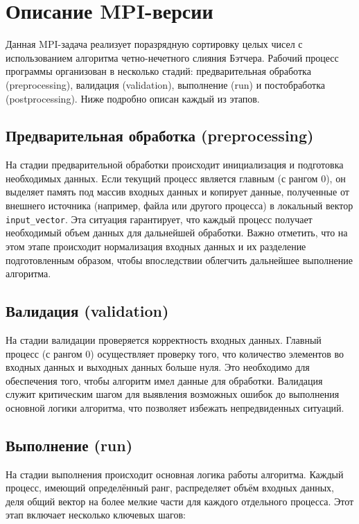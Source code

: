 \documentclass[12pt]{article}
\begin{document}
\section{Описание MPI-версии}

Данная MPI-задача реализует поразрядную сортировку целых чисел с использованием алгоритма четно-нечетного слияния Бэтчера. Рабочий процесс программы организован в несколько стадий: предварительная обработка (preprocessing), валидация (validation), выполнение (run) и постобработка (postprocessing). Ниже подробно описан каждый из этапов.

\subsection{Предварительная обработка (preprocessing)}

На стадии предварительной обработки происходит инициализация и подготовка необходимых данных. Если текущий процесс является главным (с рангом 0), он выделяет память под массив входных данных и копирует данные, полученные от внешнего источника (например, файла или другого процесса) в локальный вектор \texttt{input\_vector}. Эта ситуация гарантирует, что каждый процесс получает необходимый объем данных для дальнейшей обработки. Важно отметить, что на этом этапе происходит нормализация входных данных и их разделение подготовленным образом, чтобы впоследствии облегчить дальнейшее выполнение алгоритма.

\subsection{Валидация (validation)}

На стадии валидации проверяется корректность входных данных. Главный процесс (с рангом 0) осуществляет проверку того, что количество элементов во входных данных и выходных данных больше нуля. Это необходимо для обеспечения того, чтобы алгоритм имел данные для обработки. Валидация служит критическим шагом для выявления возможных ошибок до выполнения основной логики алгоритма, что позволяет избежать непредвиденных ситуаций.

\subsection{Выполнение (run)}

На стадии выполнения происходит основная логика работы алгоритма. Каждый процесс, имеющий определённый ранг, распределяет объём входных данных, деля общий вектор на более мелкие части для каждого отдельного процесса. Этот этап включает несколько ключевых шагов:
\end{document}
